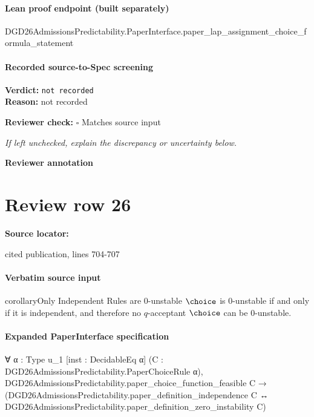 \documentclass[10pt]{article}
\newcommand{\reviewerbox}{%
  \par\noindent\fbox{\parbox{0.96\linewidth}{\rule{0pt}{0.38in}}}\par
}
\newcommand{\reviewmatch}[1]{%
  \par\noindent\textbf{Reviewer check:} $\square$\; #1\par
  \noindent\emph{If left unchecked, explain the discrepancy or uncertainty below.}\par
}
\begin{document}
\paragraph{Lean proof endpoint (built separately)}\begin{ReviewVerbatim}
DGD26AdmissionsPredictability.PaperInterface.paper_lap_assignment_choice_formula_statement
\end{ReviewVerbatim}

\paragraph{Recorded source-to-Spec screening}
\textbf{Verdict:} \texttt{not recorded}
\\
\textbf{Reason:} not recorded
\reviewmatch{Matches source input}
\noindent\textbf{Reviewer annotation}\par
\reviewerbox
\clearpage
\hypertarget{source-claim-b05952c99a84b6af}{}
\section*{Review row 26}
\textbf{Source locator:} {\footnotesize\raggedright cited publication, lines 704-\allowbreak{}707\par}
\paragraph{Verbatim source input}
\begin{ReviewVerbatim}
\begin{restatable}{corollary}{Only Independent Rules are 0-unstable}
\label{thm:independent-zero-unstable}
$\choice$ is $0$-unstable if and only if it is independent, and therefore no $q$-acceptant $\choice$ can be $0$-unstable.
\end{restatable}
\end{ReviewVerbatim}


\paragraph{Expanded PaperInterface specification}
\begin{ReviewVerbatim}
∀ {α : Type u_1} [inst : DecidableEq α] (C : DGD26AdmissionsPredictability.PaperChoiceRule α),
  DGD26AdmissionsPredictability.paper_choice_function_feasible C →
    (DGD26AdmissionsPredictability.paper_definition_independence C ↔
      DGD26AdmissionsPredictability.paper_definition_zero_instability C)
\end{ReviewVerbatim}
\end{document}
